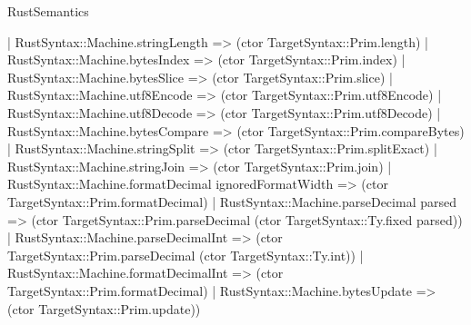 \begin{lexlean}{RustSemantics}
\begin{semanticmodule}
{    | RustSyntax::Machine.stringLength => (ctor TargetSyntax::Prim.length)
    | RustSyntax::Machine.bytesIndex => (ctor TargetSyntax::Prim.index)
    | RustSyntax::Machine.bytesSlice => (ctor TargetSyntax::Prim.slice)
    | RustSyntax::Machine.utf8Encode => (ctor TargetSyntax::Prim.utf8Encode)
    | RustSyntax::Machine.utf8Decode => (ctor TargetSyntax::Prim.utf8Decode)
    | RustSyntax::Machine.bytesCompare => (ctor TargetSyntax::Prim.compareBytes)
    | RustSyntax::Machine.stringSplit => (ctor TargetSyntax::Prim.splitExact)
    | RustSyntax::Machine.stringJoin => (ctor TargetSyntax::Prim.join)
    | RustSyntax::Machine.formatDecimal ignoredFormatWidth => (ctor TargetSyntax::Prim.formatDecimal)
    | RustSyntax::Machine.parseDecimal parsed => (ctor TargetSyntax::Prim.parseDecimal (ctor TargetSyntax::Ty.fixed parsed))
    | RustSyntax::Machine.parseDecimalInt => (ctor TargetSyntax::Prim.parseDecimal (ctor TargetSyntax::Ty.int))
    | RustSyntax::Machine.formatDecimalInt => (ctor TargetSyntax::Prim.formatDecimal)
    | RustSyntax::Machine.bytesUpdate => (ctor TargetSyntax::Prim.update))
}


\end{semanticmodule}
\end{lexlean}
